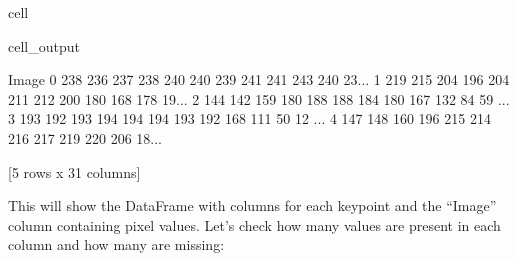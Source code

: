 \documentclass[letterpaper,10pt,english]{jupyterBook}
\begin{document}
\begin{sphinxuseclass}{cell}
\begin{sphinxVerbatimOutput}
\begin{sphinxuseclass}{cell_output}
\begin{sphinxVerbatim}[commandchars=\\\{\}]
                                               Image  
0  238 236 237 238 240 240 239 241 241 243 240 23...  
1  219 215 204 196 204 211 212 200 180 168 178 19...  
2  144 142 159 180 188 188 184 180 167 132 84 59 ...  
3  193 192 193 194 194 194 193 192 168 111 50 12 ...  
4  147 148 160 196 215 214 216 217 219 220 206 18...  

[5 rows x 31 columns]
\end{sphinxVerbatim}

\end{sphinxuseclass}\end{sphinxVerbatimOutput}

\end{sphinxuseclass}
\sphinxAtStartPar
This will show the DataFrame with columns for each keypoint and the “Image” column containing pixel values. Let’s check how many values are present in each column and how many are missing:
\end{document}
